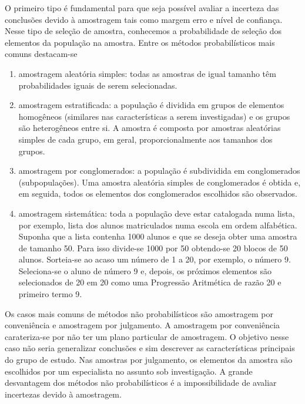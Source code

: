 O primeiro tipo é fundamental para que seja possível avaliar a incerteza das conclusões devido à amostragem tais como margem erro e nível de confiança.  Nesse tipo de seleção de amostra, conhecemos a probabilidade de seleção dos elementos da população na amostra. Entre os métodos probabilísticos mais comuns destacam-se
\begin{enumerate}
\item {} 
amostragem aleatória simples: todas as amostras de igual tamanho têm probabilidades iguais de serem selecionadas.

\item {} 
amostragem estratificada: a população é dividida em grupos de elementos homogêneos (similares nas características a serem investigadas) e os grupos são heterogêneos entre si. A amostra é composta por amostras aleatórias simples de cada grupo, em geral, proporcionalmente aos tamanhos dos grupos.

\item {} 
amostragem por conglomerados: a população é subdividida em conglomerados (subpopulações). Uma amostra aleatória simples de conglomerados é obtida e, em seguida, todos os elementos dos conglomerados escolhidos são observados.

\item {} 
amostragem sistemática: toda a população deve estar catalogada numa lista, por exemplo, lista dos alunos matriculados numa escola em ordem alfabética. Suponha que a lista contenha 1000 alunos e que se deseja obter uma amostra de tamanho 50. Para isso divide-se 1000 por 50 obtendo-se 20 blocos de 50 alunos. Sorteia-se ao acaso um número de 1 a 20, por exemplo, o número 9. Seleciona-se o aluno de número 9 e, depois, os próximos elementos são selecionados de 20 em 20 como uma Progressão Aritmética de razão 20 e primeiro termo 9.

\end{enumerate}

Os casos mais comuns de métodos não probabilísticos são amostragem por conveniência e amostragem por julgamento. A amostragem por conveniência carateriza-se por não ter um plano particular de amostragem. O objetivo nesse caso não seria generalizar conclusões e sim descrever as características principais do grupo de estudo.  Nas amostras por julgamento, os elementos da amostra são escolhidos por um especialista no assunto sob investigação. A grande desvantagem dos métodos não probabilísticos é a impossibilidade de avaliar incertezas devido à amostragem.

